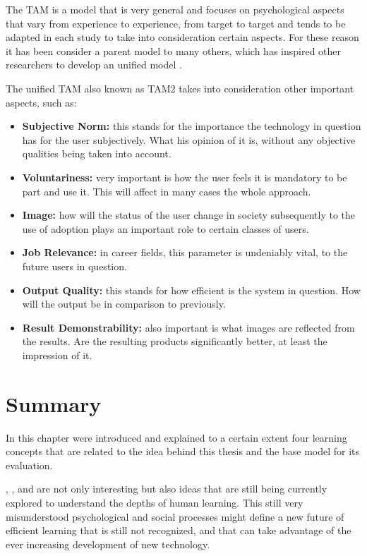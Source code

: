 The TAM is a model that is very general and focuses on psychological aspects that 
vary from experience to experience, from target to target and tends to be adapted
in each study to take into consideration certain aspects. For these reason it has
been consider a parent model to many others, which has inspired other researchers 
to develop an unified model \cite{venkatesh_davis_2000}.

The unified TAM also known as TAM2 takes into consideration other important aspects,
such as:

\begin{itemize}
    \item \textbf{Subjective Norm:}  this stands for the importance the technology in question
        has for the user subjectively. What his opinion of it is, without any objective qualities 
        being taken into account.
    \item \textbf{Voluntariness:} very important is how the user feels it is mandatory to be 
        part and use it. This will affect in many cases the whole approach.
    \item \textbf{Image:} how will the status of the user change in society subsequently to the use
        of adoption plays an important role to certain classes of users. 
    \item \textbf{Job Relevance:} in career fields, this parameter is undeniably vital, to the 
        future users in question.
    \item \textbf{Output Quality:}  this stands for how efficient is the system in question. How will
        the output be in comparison to previously. 
    \item \textbf{Result Demonstrability:} also important is what images are reflected from the results.
        Are the resulting products significantly better, at least the impression of it.
\end{itemize}


\section{Summary}

In this chapter were introduced and explained to a certain extent four learning concepts that are related
to the idea behind this thesis and the base model for its evaluation. 

, ,  and  are not only
interesting but also ideas that are still being currently explored to understand the depths of human
learning. This still very misunderstood psychological and social processes might define a new future
of efficient learning that is still not recognized, and that can take advantage of the ever increasing
development of new technology.

